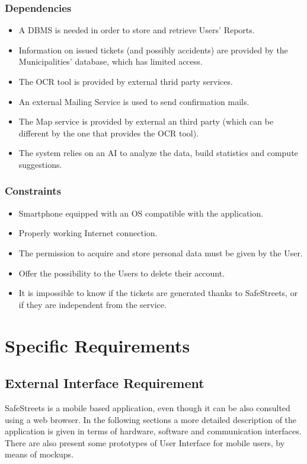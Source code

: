 \documentclass{report}
\begin{document}
\subsection{Dependencies}
\begin{itemize}
	\item A DBMS is needed in order to store and retrieve Users’ Reports.
	\item Information on issued tickets (and possibly accidents) are provided by the Municipalities' database, which has limited access. 
	\item The OCR tool is provided by external thrid party services.
	\item An external Mailing Service is used to send confirmation mails.
	\item The Map service is provided by external an third party (which can be different by the one that provides the OCR tool).
	\item The system relies on an AI to analyze the data, build statistics and compute suggestions.
\end{itemize}
\subsection{Constraints} \label{constraints}
\begin{itemize}
	\item Smartphone equipped with an OS compatible with the application.
	\item Properly working Internet connection.
	\item The permission to acquire and store personal data must be given by the User. 
	\item Offer the possibility to the Users to delete their account.
	\item It is impossible to know if the tickets are generated thanks to SafeStreets, or if they are independent from the service.
	
\end{itemize}

\chapter{Specific Requirements}
\section{External Interface Requirement}
SafeStreets is a mobile based application, even though it can be also consulted using a web browser. In the following sections a more detailed description of the application is given in terms of hardware, software and communication interfaces. There are also present some prototypes of User Interface for mobile users, by means of mockups.
\end{document}
